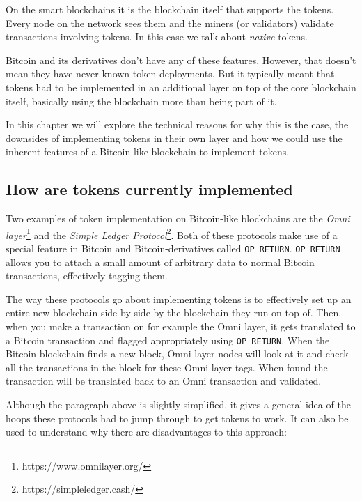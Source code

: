 \documentclass{article}
\begin{document}
On the smart blockchains it is the blockchain itself that supports the tokens. Every node on the network sees them and the miners (or validators) validate transactions involving tokens. In this case we talk about \emph{native} tokens.

Bitcoin and its derivatives don't have any of these features. However, that doesn't mean they have never known token deployments. But it typically meant that tokens had to be implemented in an additional layer on top of the core blockchain itself, basically using the blockchain more than being part of it.

In this chapter we will explore the technical reasons for why this is the case, the downsides of implementing tokens in their own layer and how we could use the inherent features of a Bitcoin-like blockchain to implement tokens.

\subsection{How are tokens currently implemented}

Two examples of token implementation on Bitcoin-like blockchains are the \emph{Omni layer}\footnote{https://www.omnilayer.org/} and the \emph{Simple Ledger Protocol}\footnote{https://simpleledger.cash/}. Both of these protocols make use of a special feature in Bitcoin and Bitcoin-derivatives called \texttt{OP\_RETURN}. \texttt{OP\_RETURN} allows you to attach a small amount of arbitrary data to normal Bitcoin transactions, effectively tagging them.

The way these protocols go about implementing tokens is to effectively set up an entire new blockchain side by side by the blockchain they run on top of. Then, when you make a transaction on for example the Omni layer, it gets translated to a Bitcoin transaction and flagged appropriately using \texttt{OP\_RETURN}. When the Bitcoin blockchain finds a new block, Omni layer nodes will look at it and check all the transactions in the block for these Omni layer tags. When found the transaction will be translated back to an Omni transaction and validated.

Although the paragraph above is slightly simplified, it gives a general idea of the hoops these protocols had to jump through to get tokens to work. It can also be used to understand why there are disadvantages to this approach:
\end{document}
